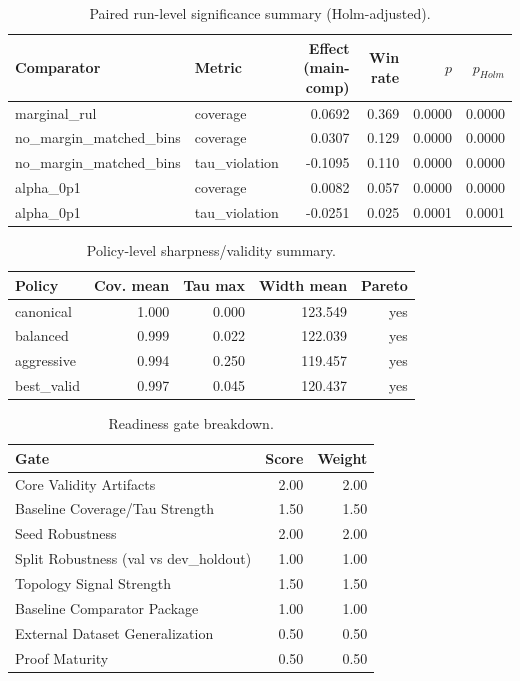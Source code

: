 \begin{table}[t]
\centering
\caption{Paired run-level significance summary (Holm-adjusted).}
\label{tab:significance}
\begin{tabular}{llrrrr}
\toprule
Comparator & Metric & Effect (main-comp) & Win rate & $p$ & $p_{Holm}$\\
\midrule
marginal\_rul & coverage & 0.0692 & 0.369 & 0.0000 & 0.0000\\
no\_margin\_matched\_bins & coverage & 0.0307 & 0.129 & 0.0000 & 0.0000\\
no\_margin\_matched\_bins & tau\_violation & -0.1095 & 0.110 & 0.0000 & 0.0000\\
alpha\_0p1 & coverage & 0.0082 & 0.057 & 0.0000 & 0.0000\\
alpha\_0p1 & tau\_violation & -0.0251 & 0.025 & 0.0001 & 0.0001\\
\bottomrule
\end{tabular}
\end{table}

\begin{table}[t]
\centering
\caption{Policy-level sharpness/validity summary.}
\label{tab:policy-sharpness}
\begin{tabular}{lrrrr}
\toprule
Policy & Cov. mean & Tau max & Width mean & Pareto\\
\midrule
canonical & 1.000 & 0.000 & 123.549 & yes\\
balanced & 0.999 & 0.022 & 122.039 & yes\\
aggressive & 0.994 & 0.250 & 119.457 & yes\\
best\_valid & 0.997 & 0.045 & 120.437 & yes\\
\bottomrule
\end{tabular}
\end{table}

\begin{table}[t]
\centering
\caption{Readiness gate breakdown.}
\label{tab:readiness-gates}
\begin{tabular}{lrr}
\toprule
Gate & Score & Weight\\
\midrule
Core Validity Artifacts & 2.00 & 2.00\\
Baseline Coverage/Tau Strength & 1.50 & 1.50\\
Seed Robustness & 2.00 & 2.00\\
Split Robustness (val vs dev\_holdout) & 1.00 & 1.00\\
Topology Signal Strength & 1.50 & 1.50\\
Baseline Comparator Package & 1.00 & 1.00\\
External Dataset Generalization & 0.50 & 0.50\\
Proof Maturity & 0.50 & 0.50\\
\bottomrule
\end{tabular}
\end{table}
